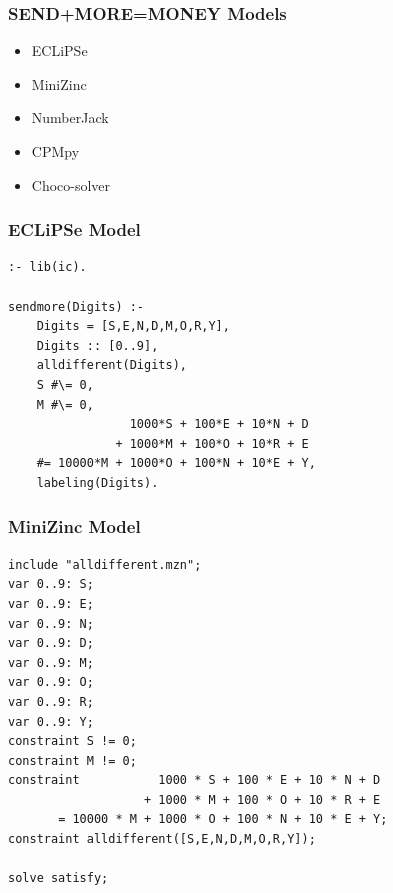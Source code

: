 \begin{frame}
\frametitle{SEND+MORE=MONEY Models}
\begin{itemize}
\item ECLiPSe \hyperlink{sendmore:eclipse}{}
\item MiniZinc \hyperlink{sendmore:minizinc}{}
\item NumberJack \hyperlink{sendmore:numberjack}{}
\item CPMpy \hyperlink{sendmore:cpmpy}{}
\item Choco-solver \hyperlink{sendmore:choco}{}
\end{itemize}
\end{frame}

\begin{frame}[fragile]
\frametitle{ECLiPSe Model}
\label{sendmore:eclipse}
\tiny
\begin{verbatim}
:- lib(ic).

sendmore(Digits) :-
    Digits = [S,E,N,D,M,O,R,Y],
    Digits :: [0..9],
    alldifferent(Digits),
    S #\= 0,
    M #\= 0,
                 1000*S + 100*E + 10*N + D
               + 1000*M + 100*O + 10*R + E
    #= 10000*M + 1000*O + 100*N + 10*E + Y,
    labeling(Digits).
\end{verbatim}
\hyperlink{sendmore:continue}{}
\end{frame}

\begin{frame}[fragile]
\frametitle{MiniZinc Model}
\label{sendmore:minizinc}
\tiny
\begin{verbatim}
include "alldifferent.mzn";
var 0..9: S;
var 0..9: E;
var 0..9: N;
var 0..9: D;
var 0..9: M;
var 0..9: O;
var 0..9: R;
var 0..9: Y;
constraint S != 0;
constraint M != 0;
constraint           1000 * S + 100 * E + 10 * N + D
                   + 1000 * M + 100 * O + 10 * R + E
       = 10000 * M + 1000 * O + 100 * N + 10 * E + Y;
constraint alldifferent([S,E,N,D,M,O,R,Y]);

solve satisfy;
\end{verbatim}
\hyperlink{sendmore:continue}{}
\end{frame}

